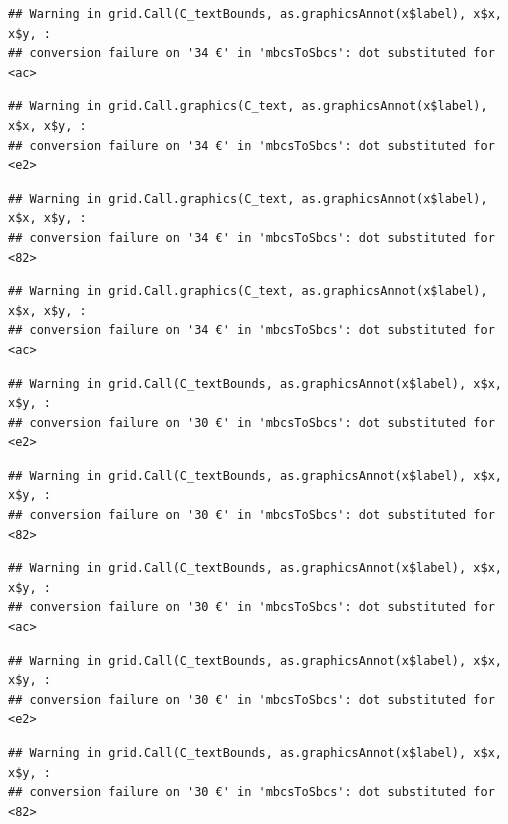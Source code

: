 \documentclass[
]{article}
\begin{document}
\begin{verbatim}
## Warning in grid.Call(C_textBounds, as.graphicsAnnot(x$label), x$x, x$y, :
## conversion failure on '34 €' in 'mbcsToSbcs': dot substituted for <ac>
\end{verbatim}

\begin{verbatim}
## Warning in grid.Call.graphics(C_text, as.graphicsAnnot(x$label), x$x, x$y, :
## conversion failure on '34 €' in 'mbcsToSbcs': dot substituted for <e2>
\end{verbatim}

\begin{verbatim}
## Warning in grid.Call.graphics(C_text, as.graphicsAnnot(x$label), x$x, x$y, :
## conversion failure on '34 €' in 'mbcsToSbcs': dot substituted for <82>
\end{verbatim}

\begin{verbatim}
## Warning in grid.Call.graphics(C_text, as.graphicsAnnot(x$label), x$x, x$y, :
## conversion failure on '34 €' in 'mbcsToSbcs': dot substituted for <ac>
\end{verbatim}

\begin{verbatim}
## Warning in grid.Call(C_textBounds, as.graphicsAnnot(x$label), x$x, x$y, :
## conversion failure on '30 €' in 'mbcsToSbcs': dot substituted for <e2>
\end{verbatim}

\begin{verbatim}
## Warning in grid.Call(C_textBounds, as.graphicsAnnot(x$label), x$x, x$y, :
## conversion failure on '30 €' in 'mbcsToSbcs': dot substituted for <82>
\end{verbatim}

\begin{verbatim}
## Warning in grid.Call(C_textBounds, as.graphicsAnnot(x$label), x$x, x$y, :
## conversion failure on '30 €' in 'mbcsToSbcs': dot substituted for <ac>
\end{verbatim}

\begin{verbatim}
## Warning in grid.Call(C_textBounds, as.graphicsAnnot(x$label), x$x, x$y, :
## conversion failure on '30 €' in 'mbcsToSbcs': dot substituted for <e2>
\end{verbatim}

\begin{verbatim}
## Warning in grid.Call(C_textBounds, as.graphicsAnnot(x$label), x$x, x$y, :
## conversion failure on '30 €' in 'mbcsToSbcs': dot substituted for <82>
\end{verbatim}
\end{document}
